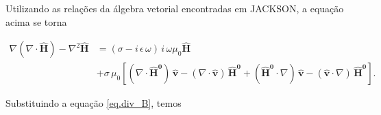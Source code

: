 Utilizando as rela\c{c}\~oes da \'algebra vetorial encontradas em JACKSON, a equa\c{c}\~ao acima se torna

\begin{align*}
\nabla(\nabla\cdot\mathbf{\widehat{H}})-\nabla^2\mathbf{\widehat{H}}&=(\sigma-i\,\epsilon\,\omega)\,i\,\omega\mu_0\mathbf{\widehat{H}}\\
&+\sigma\,\mu_0\left[(\nabla\cdot\mathbf{\widehat{H}^0})\,\mathbf{\widehat{v}}-(\nabla\cdot\mathbf{\widehat{v}})\,\mathbf{\widehat{H}^0}+(\mathbf{\widehat{H}^0}\cdot\nabla)\,\mathbf{\widehat{v}}-(\mathbf{\widehat{v}}\cdot\nabla)\,\mathbf{\widehat{H}^0}\right].
\end{align*}

Substituindo a equa\c{c}\~ao \ref{eq.div_B}, temos





















